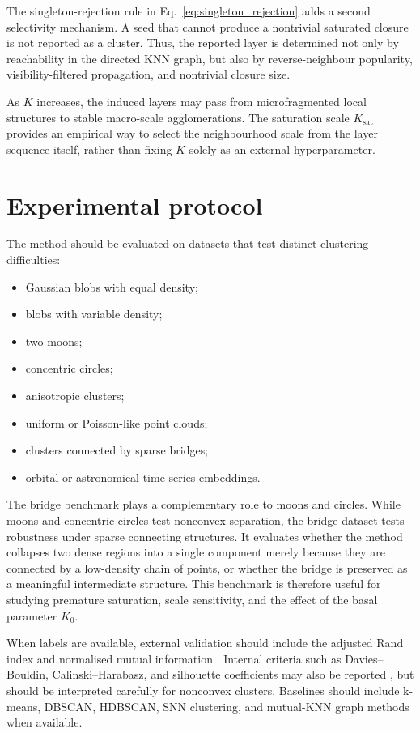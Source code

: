 \documentclass[pdflatex,sn-mathphys-num]{sn-jnl}
\begin{document}
The singleton-rejection rule in Eq.~\eqref{eq:singleton_rejection} adds a second selectivity mechanism. A seed that cannot produce a nontrivial saturated closure is not reported as a cluster. Thus, the reported layer is determined not only by reachability in the directed KNN graph, but also by reverse-neighbour popularity, visibility-filtered propagation, and nontrivial closure size.

As $K$ increases, the induced layers may pass from microfragmented local structures to stable macro-scale agglomerations. The saturation scale $K_{\mathrm{sat}}$ provides an empirical way to select the neighbourhood scale from the layer sequence itself, rather than fixing $K$ solely as an external hyperparameter.

\section{Experimental protocol}\label{sec:experimental_protocol}

The method should be evaluated on datasets that test distinct clustering difficulties:
\begin{itemize}
    \item Gaussian blobs with equal density;
    \item blobs with variable density;
    \item two moons;
    \item concentric circles;
    \item anisotropic clusters;
    \item uniform or Poisson-like point clouds;
    \item clusters connected by sparse bridges;
    \item orbital or astronomical time-series embeddings.
\end{itemize}

The bridge benchmark plays a complementary role to moons and circles. While moons and concentric circles test nonconvex separation, the bridge dataset tests robustness under sparse connecting structures. It evaluates whether the method collapses two dense regions into a single component merely because they are connected by a low-density chain of points, or whether the bridge is preserved as a meaningful intermediate structure. This benchmark is therefore useful for studying premature saturation, scale sensitivity, and the effect of the basal parameter $K_0$.

When labels are available, external validation should include the adjusted Rand index and normalised mutual information \citep{HubertArabie1985,VinhEppsBailey2010}. Internal criteria such as Davies--Bouldin, Calinski--Harabasz, and silhouette coefficients may also be reported \citep{DaviesBouldin1979,CalinskiHarabasz1974,Rousseeuw1987}, but should be interpreted carefully for nonconvex clusters. Baselines should include k-means, DBSCAN, HDBSCAN, SNN clustering, and mutual-KNN graph methods when available.
\end{document}

